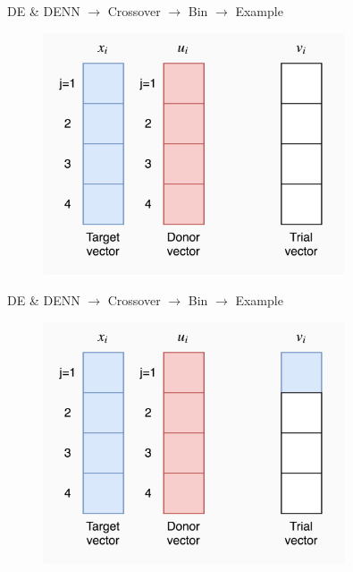 \documentclass[xcolor={usenames}]{beamer}
\begin{document}
  \begin{frame}{DE \& DENN \(\rightarrow\) Crossover \(\rightarrow\) Bin \(\rightarrow\) Example}
	\begin{figure}
		\centering
		\includegraphics[width=0.8\textwidth]{../figures/bin-0.png}
	\end{figure}
  \end{frame}
  
  \begin{frame}{DE \& DENN \(\rightarrow\) Crossover \(\rightarrow\) Bin \(\rightarrow\) Example}
	\begin{figure}
		\centering
		\includegraphics[width=0.8\textwidth]{../figures/bin-1.png}
	\end{figure}
  \end{frame}
  
\end{document}
